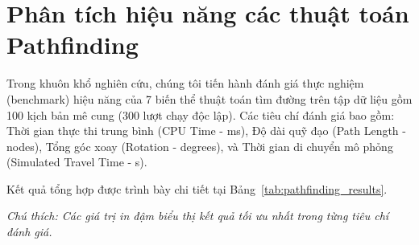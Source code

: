 \documentclass[a4paper, 12pt]{report}
\begin{document}
  \section{Phân tích hiệu năng các thuật toán Pathfinding}

  Trong khuôn khổ nghiên cứu, chúng tôi tiến hành đánh giá thực nghiệm (benchmark) hiệu năng của 7 biến thể thuật toán tìm đường trên tập dữ liệu gồm 100 kịch bản mê cung (300 lượt chạy độc lập). Các tiêu chí đánh giá bao gồm: Thời gian thực thi trung bình (CPU Time - ms), Độ dài quỹ đạo (Path Length - nodes), Tổng góc xoay (Rotation - degrees), và Thời gian di chuyển mô phỏng (Simulated Travel Time - s).

  Kết quả tổng hợp được trình bày chi tiết tại Bảng~\ref{tab:pathfinding_results}.

  \begin{table}[H]
  \centering
  \caption{Thống kê tổng hợp hiệu năng các thuật toán Pathfinding (N = 300)}
  \label{tab:pathfinding_results}
  \vspace{0.15cm}
  \small{\textit{Chú thích: Các giá trị in đậm biểu thị kết quả tối ưu nhất trong từng tiêu chí đánh giá.}}
  \end{table}
\end{document}
